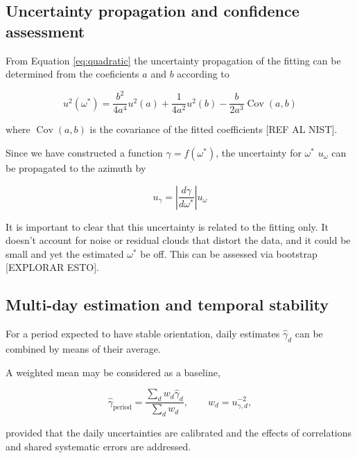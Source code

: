 \subsection{Uncertainty propagation and confidence assessment}
\label{subsec:uncertainty}

From Equation \ref{eq:quadratic} the uncertainty propagation of the fitting can be determined from the coeficients $a$ and $b$ according to


\begin{equation}
	u^2(\omega^*)=
	\frac{b^2}{4a^4}u^2(a)
	+\frac{1}{4a^2}u^2(b)
	-\frac{b}{2a^3}\operatorname{Cov}(a,b)
	\label{eq:uncertainty_1}
\end{equation}

where $\operatorname{Cov}(a,b)$ is the covariance of the fitted coefficients [REF AL NIST].

Since we have constructed a function $\gamma = f(\omega^{\ast})$, the uncertainty for $\omega^{\ast}$ $u_\omega$ can be propagated to the azimuth by 

\begin{equation}
	u_\gamma=
		\left|\frac{d\gamma}{d\omega^*}\right|u_\omega
\end{equation}

It is important to clear that this uncertainty is related to the fitting only. It doesn't account for noise or residual clouds that distort the data, and it could be small and yet the estimated $\omega^{\ast}$ be off. This can be assessed via bootstrap [EXPLORAR ESTO].



\subsection{Multi-day estimation and temporal stability}
\label{subsec:aggregation}
For a period expected to have stable orientation, daily estimates $\hat\gamma_d$ can be combined by means of their average.

A weighted mean may be considered as a baseline,

\begin{equation}
  \hat\gamma_{\mathrm{period}}=
  \frac{\sum_d w_d\hat\gamma_d}{\sum_d w_d},
  \qquad w_d=u_{\gamma,d}^{-2},
  \label{eq:aggregation}
\end{equation}

provided that the daily uncertainties are calibrated and the effects of
correlations and shared systematic errors are addressed.



